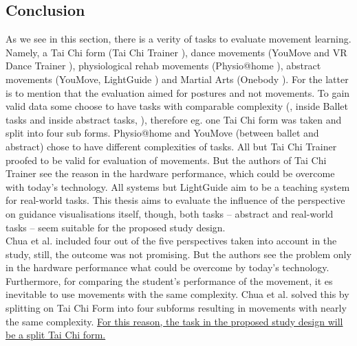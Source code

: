 \subsection{Conclusion}
As we see in this section, there is a verity of tasks to evaluate movement learning. Namely, a Tai Chi form (Tai Chi Trainer \cite{Chua2003}), dance movements (YouMove \cite{Anderson2013a} and VR Dance Trainer \cite{Chan2010}), physiological rehab movements (Physio@home \cite{Tang2015}), abstract movements (YouMove, LightGuide \cite{Sodhi2012}) and Martial Arts (Onebody \cite{Hoang2016}). For the latter is to mention that the evaluation aimed for postures and not movements. To gain valid data some choose to have tasks with comparable complexity (\cite{Chua2003}, \cite{Anderson2013a} inside Ballet tasks and inside abstract tasks, \cite{Sodhi2012}), therefore eg. one Tai Chi form was taken and split into four sub forms. Physio@home and YouMove (between ballet and abstract) chose to have different complexities of tasks. All but Tai Chi Trainer proofed to be valid for evaluation of movements. But the authors of Tai Chi Trainer see the reason in the hardware performance, which could be overcome with today's technology. All systems but LightGuide aim to be a teaching system for real-world tasks. This thesis aims to evaluate the influence of the perspective on guidance visualisations itself, though, both tasks \--- abstract and real-world tasks \--- seem suitable for the proposed study design.\\
Chua et al. included four out of the five perspectives taken into account in the study, still, the outcome was not promising. But the authors see the problem only in the hardware performance what could be overcome by today's technology. Furthermore, for comparing the student's performance of the movement, it es inevitable to use movements with the same complexity. Chua et al. solved this by splitting on Tai Chi Form into four subforms resulting in movements with nearly the same complexity. \ul{For this reason, the task in the proposed study design will be a split Tai Chi form.}

